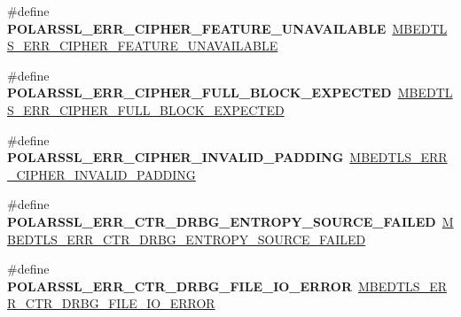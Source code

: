 \begin{DoxyCompactItemize}
\item 
\mbox{\label{compat-1_83_8h_a8625e259f484845e8fe6103f14f14f85}} 
\#define {\bfseries P\+O\+L\+A\+R\+S\+S\+L\+\_\+\+E\+R\+R\+\_\+\+C\+I\+P\+H\+E\+R\+\_\+\+F\+E\+A\+T\+U\+R\+E\+\_\+\+U\+N\+A\+V\+A\+I\+L\+A\+B\+LE}~\mbox{\hyperlink{cipher_8h_a5093ef5a2ca66691e189c4224098355e}{M\+B\+E\+D\+T\+L\+S\+\_\+\+E\+R\+R\+\_\+\+C\+I\+P\+H\+E\+R\+\_\+\+F\+E\+A\+T\+U\+R\+E\+\_\+\+U\+N\+A\+V\+A\+I\+L\+A\+B\+LE}}
\item 
\mbox{\label{compat-1_83_8h_ae92e3caeb14ac7b0a3ac63aa49d88e9e}} 
\#define {\bfseries P\+O\+L\+A\+R\+S\+S\+L\+\_\+\+E\+R\+R\+\_\+\+C\+I\+P\+H\+E\+R\+\_\+\+F\+U\+L\+L\+\_\+\+B\+L\+O\+C\+K\+\_\+\+E\+X\+P\+E\+C\+T\+ED}~\mbox{\hyperlink{cipher_8h_ac7da041aba839f2ba606eb30f7547b8b}{M\+B\+E\+D\+T\+L\+S\+\_\+\+E\+R\+R\+\_\+\+C\+I\+P\+H\+E\+R\+\_\+\+F\+U\+L\+L\+\_\+\+B\+L\+O\+C\+K\+\_\+\+E\+X\+P\+E\+C\+T\+ED}}
\item 
\mbox{\label{compat-1_83_8h_a87777f84d48de3a0d48b252d85c8adc3}} 
\#define {\bfseries P\+O\+L\+A\+R\+S\+S\+L\+\_\+\+E\+R\+R\+\_\+\+C\+I\+P\+H\+E\+R\+\_\+\+I\+N\+V\+A\+L\+I\+D\+\_\+\+P\+A\+D\+D\+I\+NG}~\mbox{\hyperlink{cipher_8h_a06295349279dcbda6b1317924d5bb810}{M\+B\+E\+D\+T\+L\+S\+\_\+\+E\+R\+R\+\_\+\+C\+I\+P\+H\+E\+R\+\_\+\+I\+N\+V\+A\+L\+I\+D\+\_\+\+P\+A\+D\+D\+I\+NG}}
\item 
\mbox{\label{compat-1_83_8h_a29337787324ee83801279c2bb3debfb3}} 
\#define {\bfseries P\+O\+L\+A\+R\+S\+S\+L\+\_\+\+E\+R\+R\+\_\+\+C\+T\+R\+\_\+\+D\+R\+B\+G\+\_\+\+E\+N\+T\+R\+O\+P\+Y\+\_\+\+S\+O\+U\+R\+C\+E\+\_\+\+F\+A\+I\+L\+ED}~\mbox{\hyperlink{ctr__drbg_8h_a15d1931ea5d133062cd93a3374a5bcf0}{M\+B\+E\+D\+T\+L\+S\+\_\+\+E\+R\+R\+\_\+\+C\+T\+R\+\_\+\+D\+R\+B\+G\+\_\+\+E\+N\+T\+R\+O\+P\+Y\+\_\+\+S\+O\+U\+R\+C\+E\+\_\+\+F\+A\+I\+L\+ED}}
\item 
\mbox{\label{compat-1_83_8h_ac24b26db879708ddef6840f37a1c94aa}} 
\#define {\bfseries P\+O\+L\+A\+R\+S\+S\+L\+\_\+\+E\+R\+R\+\_\+\+C\+T\+R\+\_\+\+D\+R\+B\+G\+\_\+\+F\+I\+L\+E\+\_\+\+I\+O\+\_\+\+E\+R\+R\+OR}~\mbox{\hyperlink{ctr__drbg_8h_ab5f1b73efeca5de8e75c273d47b8274e}{M\+B\+E\+D\+T\+L\+S\+\_\+\+E\+R\+R\+\_\+\+C\+T\+R\+\_\+\+D\+R\+B\+G\+\_\+\+F\+I\+L\+E\+\_\+\+I\+O\+\_\+\+E\+R\+R\+OR}}
\item 
\mbox{\label{compat-1_83_8h_ad2ebdb67b7c42e990590e1b5d6cbadf4}} 

\end{DoxyCompactItemize}
